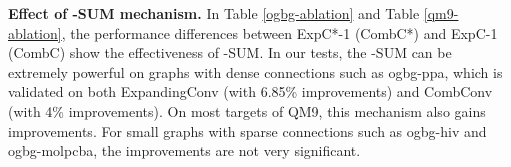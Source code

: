 \documentclass{article} \usepackage{iclr2021_conference,times}
\begin{document}
\textbf{Effect of -SUM mechanism.}
In Table \ref{ogbg-ablation} and Table \ref{qm9-ablation},
the performance differences between ExpC*-1 (CombC*) and ExpC-1 (CombC) show the effectiveness of -SUM.
In our tests,
the -SUM can be extremely powerful on graphs with dense connections such as ogbg-ppa,
which is validated on both ExpandingConv (with 6.85\% improvements) and CombConv (with 4\% improvements).
On most targets of QM9,
this mechanism also gains improvements.
For small graphs with sparse connections such as ogbg-hiv and ogbg-molpcba, the improvements are not very significant.
\begin{table}[h]
\centering
\caption{Comparisons with baselines on OGB and TU. Higher is better.
}\smallskip
{}
\end{table}
\end{document}
